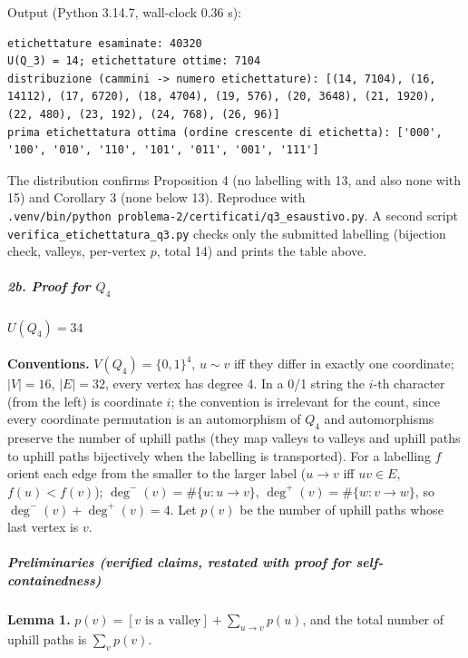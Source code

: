 Output (Python 3.14.7, wall-clock 0.36 s):

\begin{verbatim}
etichettature esaminate: 40320
U(Q_3) = 14; etichettature ottime: 7104
distribuzione (cammini -> numero etichettature): [(14, 7104), (16, 14112), (17, 6720), (18, 4704), (19, 576), (20, 3648), (21, 1920), (22, 480), (23, 192), (24, 768), (26, 96)]
prima etichettatura ottima (ordine crescente di etichetta): ['000', '100', '010', '110', '101', '011', '001', '111']
\end{verbatim}

The distribution confirms Proposition 4 (no labelling with 13, and also
none with 15) and Corollary 3 (none below 13). Reproduce with
\texttt{.venv/bin/python\ problema-2/certificati/q3\_esaustivo.py}. A
second script \texttt{verifica\_etichettatura\_q3.py} checks only the
submitted labelling (bijection check, valleys, per-vertex \(p\), total
14) and prints the table above.

\subparagraph{\texorpdfstring{2b. Proof for
\(Q_4\)}{2b. Proof for Q\_4}}\label{b.-proof-for-q_4}

\paragraph{\texorpdfstring{\(U(Q_4)=34\)}{U(Q\_4)=34}}\label{uq_434}

\textbf{Conventions.} \(V(Q_4)=\{0,1\}^4\), \(u\sim v\) iff they differ
in exactly one coordinate; \(|V|=16\), \(|E|=32\), every vertex has
degree 4. In a 0/1 string the \(i\)-th character (from the left) is
coordinate \(i\); the convention is irrelevant for the count, since
every coordinate permutation is an automorphism of \(Q_4\) and
automorphisms preserve the number of uphill paths (they map valleys to
valleys and uphill paths to uphill paths bijectively when the labelling
is transported). For a labelling \(f\) orient each edge from the smaller
to the larger label (\(u\to v\) iff \(uv\in E\), \(f(u)<f(v)\));
\(\deg^-(v)=\#\{u:u\to v\}\), \(\deg^+(v)=\#\{w: v\to w\}\), so
\(\deg^-(v)+\deg^+(v)=4\). Let \(p(v)\) be the number of uphill paths
whose last vertex is \(v\).

\subparagraph{Preliminaries (verified claims, restated with proof for
self-containedness)}\label{preliminaries-verified-claims-restated-with-proof-for-self-containedness}

\textbf{Lemma 1.} \(p(v)=[v\text{ is a valley}]+\sum_{u\to v}p(u)\), and
the total number of uphill paths is \(\sum_v p(v)\).

